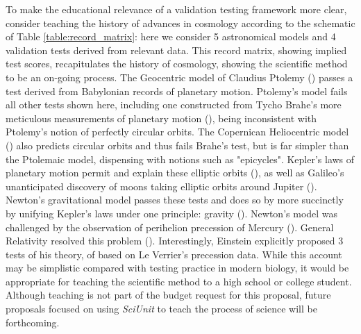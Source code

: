 \documentclass[11pt,letterpaper]{article}
\begin{document}
To make the educational relevance of a validation testing framework more clear, consider teaching the history of advances in cosmology according 
to the schematic of Table \ref{table:record_matrix}:  here we consider 5 astronomical models and 4 validation tests derived from relevant data.  This record matrix, showing implied test scores, recapitulates the history of cosmology, showing the scientific method to be an on-going process.  The Geocentric model of Claudius Ptolemy (\cite{ptolemy_almagest_150}) passes a test derived from Babylonian records of planetary motion.  Ptolemy's model fails all other tests shown here, including one constructed from Tycho Brahe's more meticulous measurements of planetary motion (\cite{kepler_rudolphine_1627}), being inconsistent with Ptolemy's notion of perfectly circular orbits.  The Copernican Heliocentric model (\cite{copernicus_revolutionibus_1543}) also predicts circular orbits and thus fails Brahe's test, but is far simpler than the Ptolemaic model, dispensing with notions such as "epicycles".  Kepler's laws of planetary motion permit and explain these elliptic orbits (\cite{kepler_astronomia_1609}), as well as Galileo's unanticipated discovery of moons taking elliptic orbits around Jupiter (\cite{galilei_siderius_1610}).  Newton's gravitational model passes these tests and does so by more succinctly by unifying Kepler's laws under one principle: gravity (\cite{newton_philosophiae_1687}).  Newton's model was challenged by the observation of perihelion precession of Mercury (\cite{le_verrier_lettre_1859}).  General Relativity resolved this problem (\cite{einstein_foundation_1916}).  Interestingly, Einstein explicitly proposed 3 tests of his theory, of based on Le Verrier's precession data.  While this account may be simplistic compared with testing practice in modern biology, it would be appropriate for teaching the scientific method to a high school or college student.  Although teaching is not part of the budget request for this proposal, future proposals focused on using \textit{SciUnit} to teach the process of science will be forthcoming.  
\end{document}
